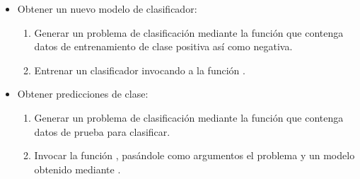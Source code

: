 \begin{itemize}
\item
  Obtener un nuevo modelo de clasificador:
  \begin{enumerate}
  \item
    Generar un problema de clasificación mediante la función
     que contenga datos de entrenamiento de clase
    positiva así como negativa.
  \item
    Entrenar un clasificador invocando a la función
    .
  \end{enumerate}
\item
  Obtener predicciones de clase:
  \begin{enumerate}
  \item
    Generar un problema de clasificación mediante la función
     que contenga datos de prueba para clasificar.
  \item
    Invocar la función , pasándole como
    argumentos el problema y un modelo obtenido mediante
    .
  \end{enumerate}
\end{itemize}
%
